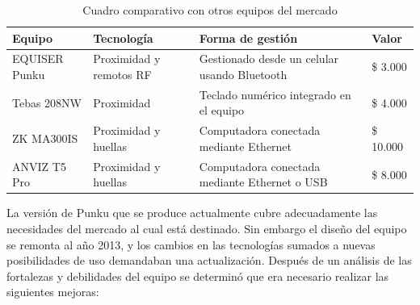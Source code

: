 \begin{table}[ht]
	\centering
	\caption{Cuadro comparativo con otros equipos del mercado}
	\begin{tabular}{C{25mm} C{25mm} C{50mm} C{20mm}}    
		\toprule
		\textbf{Equipo}  
			& \textbf{Tecnología} 
			& \textbf{Forma de gestión}
			& \textbf{Valor}  \\
		\midrule
		EQUISER \newline Punku 
			& Proximidad y remotos RF
			& Gestionado desde un \newline celular usando Bluetooth
			& \$ 3.000\\
		\midrule
		Tebas \newline 208NW \cite{TEBAS}
			& Proximidad
			& Teclado numérico \newline integrado en el equipo
			& \$ 4.000\\
		\midrule
		ZK \newline MA300IS \cite{ZK}
			& Proximidad \newline y huellas
			& Computadora conectada \newline mediante Ethernet
			& \$ 10.000\\
		\midrule
		ANVIZ \newline T5 Pro \cite{ANVIZ}
			& Proximidad \newline y huellas
			& Computadora conectada \newline mediante Ethernet o USB
			& \$ 8.000\\
		\bottomrule
		\hline
	\end{tabular}
	\label{tab:ComparacionActual}
\end{table}

La versión de Punku que se produce actualmente cubre adecuadamente las necesidades del mercado al cual está destinado. Sin embargo el diseño del equipo se remonta al año 2013, y los cambios en las tecnologías sumados a nuevas posibilidades de uso demandaban una actualización. Después de un análisis de las fortalezas y debilidades del equipo se determinó que era necesario realizar las siguientes mejoras:  

